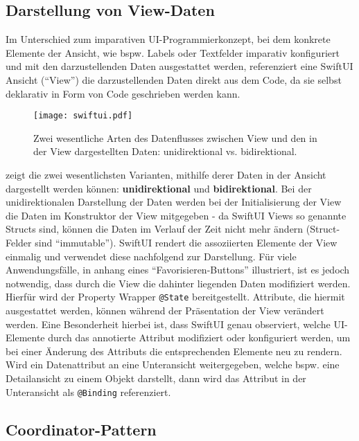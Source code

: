 \subsection{Darstellung von View-Daten}

Im Unterschied zum imparativen UI-Programmierkonzept, bei dem konkrete Elemente der Ansicht, wie bspw. Labels oder Textfelder imparativ konfiguriert und mit den darzustellenden Daten ausgestattet werden, referenziert eine SwiftUI Ansicht (\enquote{View}) die darzustellenden Daten direkt aus dem Code, da sie selbst deklarativ in Form von Code geschrieben werden kann.

\begin{figure}[H]
\texttt{[image: swiftui.pdf]}
\caption{Zwei wesentliche Arten des Datenflusses zwischen View und den in der View dargestellten Daten: unidirektional vs. bidirektional.}\label{fig:swiftui}
\end{figure}

 zeigt die zwei wesentlichsten Varianten, mithilfe derer Daten in der Ansicht dargestellt werden können: \textbf{unidirektional} und \textbf{bidirektional}. Bei der unidirektionalen Darstellung der Daten werden bei der Initialisierung der View die Daten im Konstruktor der View mitgegeben - da SwiftUI Views so genannte Structs sind, können die Daten im Verlauf der Zeit nicht mehr ändern (Struct-Felder sind \enquote{immutable}). SwiftUI rendert die assoziierten Elemente der View einmalig und verwendet diese nachfolgend zur Darstellung. Für viele Anwendungsfälle, in  anhang eines \enquote{Favorisieren-Buttons} illustriert, ist es jedoch notwendig, dass durch die View die dahinter liegenden Daten modifiziert werden. Hierfür wird der Property Wrapper \texttt{@State} bereitgestellt. Attribute, die hiermit ausgestattet werden, können während der Präsentation der View verändert werden. Eine Besonderheit hierbei ist, dass SwiftUI genau observiert, welche UI-Elemente durch das annotierte Attribut modifiziert oder konfiguriert werden, um bei einer Änderung des Attributs die entsprechenden Elemente neu zu rendern. Wird ein Datenattribut an eine Unteransicht weitergegeben, welche bspw. eine Detailansicht zu einem Objekt darstellt, dann wird das Attribut in der Unteransicht als \texttt{@Binding} referenziert.

\subsection{Coordinator-Pattern}

